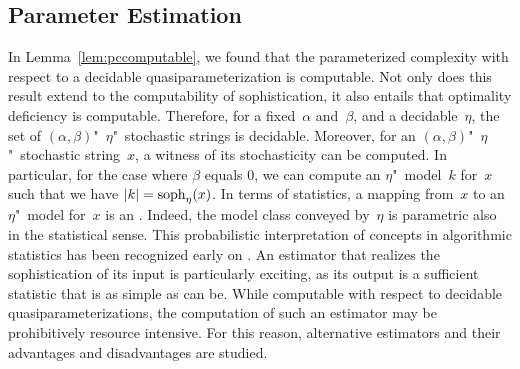 \subsection{Parameter Estimation}
\label{sec:estimation}%
In Lemma~\ref{lem:pccomputable}, we found that the parameterized complexity with respect to a decidable quasiparameterization is computable.
Not only does this result extend to the computability of sophistication, it also entails that optimality deficiency is computable.
Therefore, for a fixed~$\alpha$ and~$\beta$, and a decidable~$\eta$, the set of $(\alpha, \beta)$"~$\eta$"~stochastic strings is decidable.
Moreover, for an $(\alpha, \beta)$"~$\eta$"~stochastic string~$x$, a witness of its stochasticity can be computed.
In particular, for the case where $\beta$ equals $0$, we can compute an $\eta$"~model~$k$ for~$x$ such that we have ${\lvert k\rvert} = \operatorname{soph}_\eta(x)$.
In terms of statistics, a mapping from~$x$ to an $\eta$"~model for~$x$ is an .
Indeed, the model class conveyed by~$\eta$ is parametric also in the statistical sense.
This probabilistic interpretation of concepts in algorithmic statistics has been recognized early on \parencite{rissanen1983universal,vitanyi2000minimum,gacs2001algorithmic}.
An estimator that realizes the sophistication of its input is particularly exciting, as its output is a sufficient statistic that is as simple as can be.
While computable with respect to decidable quasiparameterizations, the computation of such an estimator may be prohibitively resource intensive.
For this reason, alternative estimators and their advantages and disadvantages are studied.

